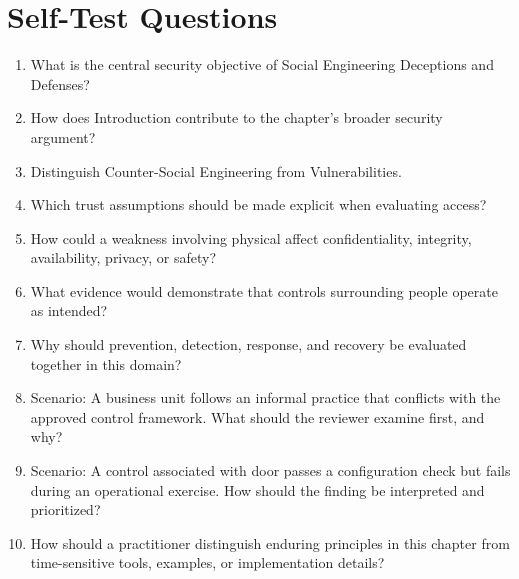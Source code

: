 \documentclass[11pt]{article}
\begin{document}
\section*{Self-Test Questions}
\begin{enumerate}
\item What is the central security objective of Social Engineering Deceptions and Defenses?
\item How does Introduction contribute to the chapter's broader security argument?
\item Distinguish Counter-Social Engineering from Vulnerabilities.
\item Which trust assumptions should be made explicit when evaluating access?
\item How could a weakness involving physical affect confidentiality, integrity, availability, privacy, or safety?
\item What evidence would demonstrate that controls surrounding people operate as intended?
\item Why should prevention, detection, response, and recovery be evaluated together in this domain?
\item Scenario: A business unit follows an informal practice that conflicts with the approved control framework. What should the reviewer examine first, and why?
\item Scenario: A control associated with door passes a configuration check but fails during an operational exercise. How should the finding be interpreted and prioritized?
\item How should a practitioner distinguish enduring principles in this chapter from time-sensitive tools, examples, or implementation details?
\end{enumerate}
\end{document}
